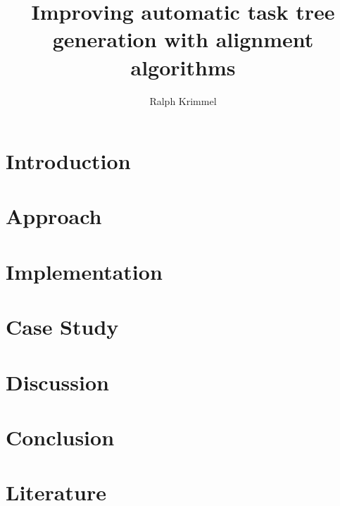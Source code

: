 \documentclass{scrartcl}
\title{Improving automatic task tree generation with alignment algorithms}
\author{Ralph Krimmel}
\begin{document}
\maketitle


\newcommand{\beginsupplement}{%
	\setcounter{table}{0}
	\renewcommand{\thetable}{\Roman{table}}%
	\setcounter{figure}{0}
	\renewcommand{\thefigure}{\Roman{figure}}%
}



\clearpage
\thispagestyle{empty}


\setcounter{page}{3}
\tableofcontents


\clearpage
\section{Introduction}


\section{Approach}


\clearpage
\section{Implementation}


\clearpage
\section{Case Study}


\clearpage
\section{Discussion}


\section{Conclusion}


%

%

\clearpage
\section*{Literature}


\end{document}
